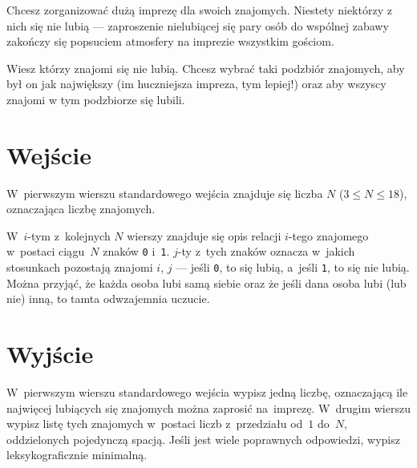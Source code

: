 \documentclass{spiral-kurs}
\begin{document}
\makeheader
%
Chcesz zorganizować dużą imprezę dla swoich znajomych. Niestety niektórzy z
nich się nie lubią --- zaproszenie nielubiącej się pary osób do wspólnej zabawy
zakończy się popsuciem atmosfery na imprezie wszystkim gościom.

Wiesz którzy znajomi się nie lubią. Chcesz wybrać taki podzbiór znajomych, aby
był on jak największy (im huczniejsza impreza, tym lepiej!) oraz aby wszyscy
znajomi w tym podzbiorze się lubili.

\section{Wejście}
W~pierwszym wierszu standardowego wejścia znajduje się liczba $N$ ($3 \leq
N \leq 18$), oznaczająca liczbę znajomych.

W~$i$-tym z~kolejnych $N$ wierszy znajduje się opis relacji $i$-tego
znajomego w~postaci ciągu~$N$ znaków \texttt{0} i~\texttt{1}. $j$-ty z~tych
znaków oznacza w~jakich stosunkach pozostają znajomi $i$, $j$ --- jeśli
\texttt{0}, to się lubią, a~jeśli \texttt{1}, to się nie lubią. Można przyjąć,
że każda osoba lubi samą siebie oraz że jeśli dana osoba lubi (lub nie) inną,
to tamta odwzajemnia uczucie.

\section{Wyjście}
W~pierwszym wierszu standardowego wejścia wypisz jedną liczbę, oznaczającą ile
najwięcej lubiących się znajomych można zaprosić na~imprezę. W~drugim wierszu
wypisz listę tych znajomych w~postaci liczb z~przedziału od~$1$ do~$N$,
oddzielonych pojedynczą spacją. Jeśli jest wiele poprawnych odpowiedzi, wypisz
leksykograficznie minimalną.
	\vspace{-4pt}
\end{document}
